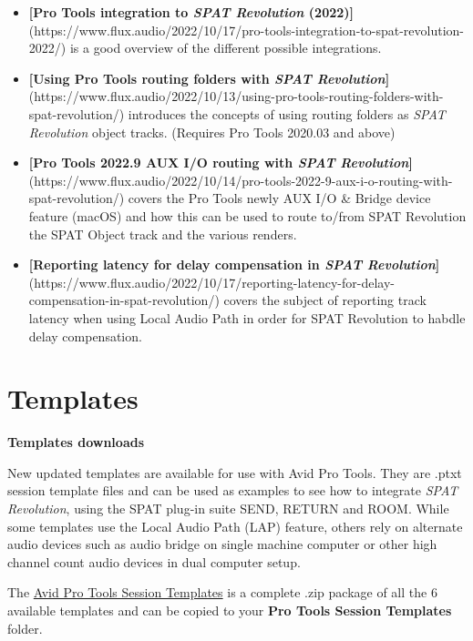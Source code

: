 \documentclass[
  letterpaper,
  DIV=11,
  numbers=noendperiod]{scrreport}
\begin{document}
\begin{itemize}
\item
  \textbf{{[}Pro Tools integration to \emph{SPAT Revolution}
  (2022){]}}(https://www.flux.audio/2022/10/17/pro-tools-integration-to-spat-revolution-2022/)
  is a good overview of the different possible integrations.
\item
  \textbf{{[}Using Pro Tools routing folders with \emph{SPAT
  Revolution}{]}}(https://www.flux.audio/2022/10/13/using-pro-tools-routing-folders-with-spat-revolution/)
  introduces the concepts of using routing folders as \emph{SPAT
  Revolution} object tracks. (Requires Pro Tools 2020.03 and above)
\item
  \textbf{{[}Pro Tools 2022.9 AUX I/O routing with \emph{SPAT
  Revolution}{]}}(https://www.flux.audio/2022/10/14/pro-tools-2022-9-aux-i-o-routing-with-spat-revolution/)
  covers the Pro Tools newly AUX I/O \& Bridge device feature (macOS)
  and how this can be used to route to/from SPAT Revolution the SPAT
  Object track and the various renders.
\item
  \textbf{{[}Reporting latency for delay compensation in \emph{SPAT
  Revolution}{]}}(https://www.flux.audio/2022/10/17/reporting-latency-for-delay-compensation-in-spat-revolution/)
  covers the subject of reporting track latency when using Local Audio
  Path in order for SPAT Revolution to habdle delay compensation.
\end{itemize}

\hypertarget{templates-1}{%
\section{Templates}\label{templates-1}}

\textbf{Templates downloads}

New updated templates are available for use with Avid Pro Tools. They
are .ptxt session template files and can be used as examples to see how
to integrate \emph{SPAT Revolution}, using the SPAT plug-in suite SEND,
RETURN and ROOM. While some templates use the Local Audio Path (LAP)
feature, others rely on alternate audio devices such as audio bridge on
single machine computer or other high channel count audio devices in
dual computer setup.

The \href{https://public.3.basecamp.com/p/N48YKyqnBWXmMq1Fohskew8c}{Avid
Pro Tools Session Templates} is a complete .zip package of all the 6
available templates and can be copied to your \textbf{Pro Tools Session
Templates} folder.
\end{document}
